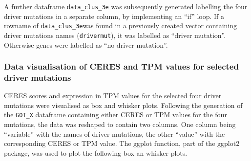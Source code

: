 \documentclass[]{article}
\newenvironment{Shaded}{\begin{snugshade}}{\end{snugshade}}
\newcommand{\CommentTok}[1]{\textcolor[rgb]{0.56,0.35,0.01}{\textit{#1}}}
\newcommand{\ControlFlowTok}[1]{\textcolor[rgb]{0.13,0.29,0.53}{\textbf{#1}}}
\newcommand{\DecValTok}[1]{\textcolor[rgb]{0.00,0.00,0.81}{#1}}
\newcommand{\KeywordTok}[1]{\textcolor[rgb]{0.13,0.29,0.53}{\textbf{#1}}}
\newcommand{\NormalTok}[1]{#1}
\newcommand{\OperatorTok}[1]{\textcolor[rgb]{0.81,0.36,0.00}{\textbf{#1}}}
\newcommand{\StringTok}[1]{\textcolor[rgb]{0.31,0.60,0.02}{#1}}
\begin{document}
A further dataframe \texttt{data\_clus\_3e} was subsequently generated
labelling the four driver mutations in a separate column, by
implementing an ``if'' loop. If a rowname of \texttt{data\_clus\_3e}was
found in a previously created vector containing driver mutations names
(\texttt{drivermut}), it was labelled as ``driver mutation''. Otherwise
genes were labelled as ``no driver mutation''.

\begin{Shaded}
\end{Shaded}

\hypertarget{data-visualisation-of-ceres-and-tpm-values-for-selected-driver-mutations}{%
\subsubsection{Data visualisation of CERES and TPM values for selected
driver
mutations}\label{data-visualisation-of-ceres-and-tpm-values-for-selected-driver-mutations}}

CERES scores and expression in TPM values for the selected four driver
mutations were visualised as box and whisker plots. Following the
generation of the \texttt{GOI\_X} dataframe containing either CERES or
TPM values for the four mutations, the data was reshaped to contain two
columns. One column being ``variable'' with the names of driver
mutations, the other ``value'' with the corresponding CERES or TPM
value. The ggplot function, part of the ggplot2 package, was used to
plot the following box an whisker plots.
\end{document}
